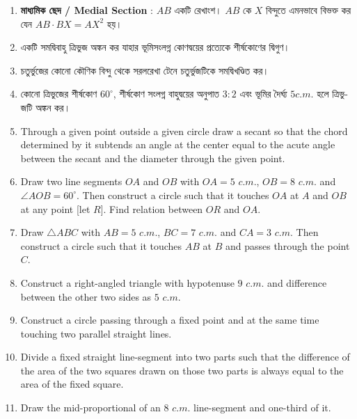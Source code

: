 \documentclass[11pt, a4paper]{article}
\begin{document}
\begin{enumerate}
	\item \textbf{\textbengali{মাধ্যমিক ছেদ} / Medial Section} : $AB$ \textbengali{একটি রেখাংশ।} $AB$ \textbengali{কে}  $X$ \textbengali{বিন্দুতে এমনভাবে বিভক্ত কর যেন} $AB \cdot BX = AX^2$ \textbengali{হয়।}
	
	\item \textbengali{একটি সমদ্বিবাহু ত্রিভুজ অঙ্কন কর যাহার ভূমিসংলগ্ন কোণদ্বয়ের প্রত্যেকে শীর্ষকোণের দ্বিগুণ।}
	
	\item \textbengali{চতুর্ভুজের কোনো কৌণিক বিন্দু থেকে সরলরেখা টেনে চতুর্ভুজটিকে সমদ্বিখণ্ডিত কর।}
	
	\item \textbengali{কোনো ত্রিভুজের শীর্ষকোণ} $60^{\circ}$, \textbengali{শীর্ষকোণ সংলগ্ন বাহুদ্বয়ের অনুপাত} $3:2$ \textbengali{এবং ভূমির দৈর্ঘ্য} $5 c.m.$ \textbengali{হলে ত্রিভুজটি অঙ্কন কর।}
	
	\item Through a given point outside a given circle draw a secant so that the chord determined by it subtends an angle at the center equal to the acute angle between the secant and the diameter through the given point.
	
	\item Draw two line segments $OA$ and $OB$ with $OA = 5$ $c.m.$, $OB = 8$ $c.m.$ and $\angle AOB = 60^{\circ}$. Then construct a circle such that it touches $OA$ at $A$ and $OB$ at any point [let $R$]. Find relation between $OR$ and $OA$.
	
	\item Draw $\bigtriangleup ABC$ with $AB = 5$ $c.m.$, $BC = 7$ $c.m.$ and $CA = 3$ $c.m.$ Then construct a circle such that it touches $AB$ at $B$ and passes through the point $C$.
	
	\item Construct a right-angled triangle with hypotenuse $9$ $c.m.$ and difference between the other two sides as $5$ $c.m.$
	
	\item Construct a circle passing through a fixed point and at the same time touching two parallel straight lines.
	
	\item Divide a fixed straight line-segment into two parts such that the difference of the area of the two squares drawn on those two parts is always equal to the area of the fixed square.
	
	\item Draw the mid-proportional of an $8$ $c.m.$ line-segment and one-third of it.
	

\end{enumerate}
\end{document}
